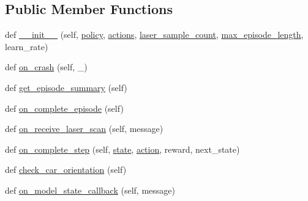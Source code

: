 \subsection*{Public Member Functions}
\begin{DoxyCompactItemize}
\item 
def \hyperlink{classtraining__node_1_1_training_node_ab81ed967681cf05efba615326fd06154}{\+\_\+\+\_\+init\+\_\+\+\_\+} (self, \hyperlink{classtraining__node_1_1_training_node_afcfa3e299101c9795ea29b425e12ffab}{policy}, \hyperlink{classreinforcement__learning__node_1_1_reinforcement_learning_node_acb5060eaf49b1cf5fae79ba36889eb02}{actions}, \hyperlink{classreinforcement__learning__node_1_1_reinforcement_learning_node_ad80aca8685a3a3301d4638b4899f7f0b}{laser\+\_\+sample\+\_\+count}, \hyperlink{classtraining__node_1_1_training_node_a5d1780473359a3b1fd3ca9ec5a1fa5e1}{max\+\_\+episode\+\_\+length}, learn\+\_\+rate)
\item 
def \hyperlink{classtraining__node_1_1_training_node_a0869616121befc86a3602e780bb4a652}{on\+\_\+crash} (self, \+\_\+)
\item 
def \hyperlink{classtraining__node_1_1_training_node_a90f18768afcf645bba834d487b383bf7}{get\+\_\+episode\+\_\+summary} (self)
\item 
def \hyperlink{classtraining__node_1_1_training_node_abd474af230098f0cf0e0505a52bfac00}{on\+\_\+complete\+\_\+episode} (self)
\item 
def \hyperlink{classtraining__node_1_1_training_node_a789582a261ef1b901c0eb2f21015b07e}{on\+\_\+receive\+\_\+laser\+\_\+scan} (self, message)
\item 
def \hyperlink{classtraining__node_1_1_training_node_ac81440d9ad7304e51f391fcc90b1622e}{on\+\_\+complete\+\_\+step} (self, \hyperlink{classtraining__node_1_1_training_node_ab3ec26c96f6e4d86cd0be251d4fd1af4}{state}, \hyperlink{classtraining__node_1_1_training_node_a9aca91d2739de83e292f046f6047c193}{action}, reward, next\+\_\+state)
\item 
def \hyperlink{classtraining__node_1_1_training_node_ad6f5da543708220bc02497320f34e31d}{check\+\_\+car\+\_\+orientation} (self)
\item 
def \hyperlink{classtraining__node_1_1_training_node_a1683b92a5672925e4d544306135cdbd8}{on\+\_\+model\+\_\+state\+\_\+callback} (self, message)
\end{DoxyCompactItemize}
